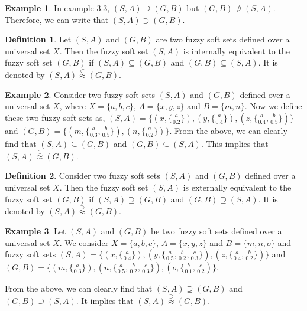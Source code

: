 \documentclass{article}
\theoremstyle{definition}
\newtheorem{definition}{Definition}[section]
\newtheorem{example}{Example}[section]
\begin{document}
\begin{example}
    In example 3.3, $(S,A)\supseteq (G,B)$ but
    $(G,B)\nsupseteq (S,A)$. Therefore, we can write that $(S,A)\supset (G,B)$.
\end{example}

\begin{definition}
    Let $(S, A)$ and $(G, B)$ are two fuzzy soft sets defined over a universal set $X$. Then the fuzzy soft set $(S,A)$ is internally equivalent to the fuzzy soft set $(G,B)$ if $(S,A)\subseteq (G,B)$ and $(G,B)\subseteq (S,A)$. It is denoted by $(S,A)\stackrel{\subset}{\approx}(G,B)$.
\end{definition}

\begin{example}
    Consider two fuzzy soft sets $(S,A)$ and $(G,B)$ defined over a universal set $X$, where $X=\{a, b, c\}$, $A=\{x, y, z\}$ and $B=\{m, n\}$. Now we define these two fuzzy soft sets as,  
    $(S,A)=\{(x, \{\frac{a}{0.2}\}), (y, \{\frac{a}{0.4}\}), (z,\{\frac{a}{0.4}, \frac{b}{0.5}\})\}$ and $(G,B)=\{(m, \{\frac{a}{0.3}, \frac{b}{0.5}\}), (n, \{\frac{a}{0.2}\})\}$. From the above, we can clearly find that $(S,A)\subseteq (G,B)$ and $(G,B)\subseteq (S,A)$. This implies that $(S,A)\stackrel{\subset}{\approx}(G,B)$.

\end{example}

\begin{definition}
     Consider two fuzzy soft sets $(S, A)$ and $(G, B)$ defined over a universal set $X$. Then the fuzzy soft set $(S,A)$ is externally equivalent to the fuzzy soft set $(G,B)$ if $(S,A)\supseteq (G,B)$ and $(G,B)\supseteq (S,A)$. It is denoted by $(S,A)\stackrel{\supset}{\approx}(G,B)$.
\end{definition}

\begin{example}
      Let $(S, A)$ and $(G, B)$ be two fuzzy soft sets defined over a universal set $X$. We consider $X=\{a, b, c\}$, $A=\{x, y, z\}$ and $B=\{m, n, o\}$ and fuzzy soft sets $(S,A)=\{(x, \{\frac{a}{0.4}\}), (y, \{\frac{a}{0.5}, \frac{b}{0.2}, \frac{c}{0.3}\}), (z,\{\frac{a}{0.4}, \frac{b}{0.2}\})\}$ and $(G,B)=\{(m, \{\frac{a}{0.3}\}), (n, \{\frac{a}{0.5}, \frac{b}{0.2}, \frac{c}{0.3}\}), (o, \{\frac{b}{0.1}, \frac{c}{0.2})\}$.

    From the above, we can clearly find that $(S,A)\supseteq (G,B)$ and $(G,B)\supseteq (S,A)$. It implies that $(S,A)\stackrel{\supset}{\approx}(G,B)$.
\end{example}
\end{document}
